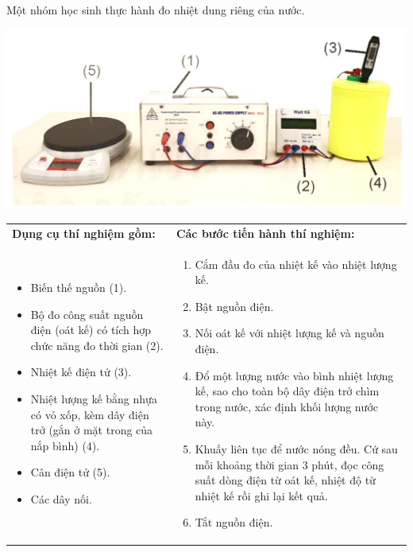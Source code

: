 \begin{ex}
	Một nhóm học sinh thực hành đo nhiệt dung riêng của nước.
	\begin{center}
		\includegraphics[scale=0.35]{../figs/FINAL-SEM1-004-7}
	\end{center}
	\begin{center}
		\begin{tabular}{|M{7cm}|M{10cm}|}
			\hline
			\textbf{Dụng cụ thí nghiệm gồm:} & \textbf{Các bước tiến hành thí nghiệm:}\\
			\begin{itemize}[-]
				\item Biến thế nguồn (1).
				\item Bộ đo công suất nguồn điện (oát kế) có tích hợp chức năng đo thời gian (2).
				\item Nhiệt kế điện tử (3).
				\item Nhiệt lượng kế bằng nhựa có vỏ xốp, kèm dây điện trở (gắn ở mặt trong của nắp bình) (4).
				\item Cân điện tử (5).
				\item Các dây nối.
			\end{itemize}
			&
			\begin{enumerate}[label=\alph*)]
				\item Cắm đầu đo của nhiệt kế vào nhiệt lượng kế.
				\item Bật nguồn điện.
				\item Nối oát kế với nhiệt lượng kế và nguồn điện.
				\item Đổ một lượng nước vào bình nhiệt lượng kế, sao cho toàn bộ dây điện trở chìm trong nước, xác định khối lượng nước này. 
				\item Khuấy liên tục để nước nóng đều. Cứ sau mỗi khoảng thời gian 3 phút, đọc công suất dòng điện từ oát kế, nhiệt độ từ nhiệt kế rồi ghi lại kết quả.
				\item Tắt nguồn điện.

\end{enumerate}
\end{tabular}
\end{center}
\end{ex}
